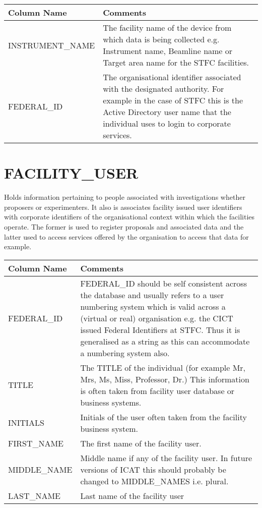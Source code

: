 \documentclass{report}
\begin{document}
\begin{tabular}{|l|l|}
\hline
Column Name & Comments \\ \hline
INSTRUMENT\_NAME & \multicolumn{1}{p{100mm}|}{
The facility name of the device from which data is being collected e.g. Instrument name, Beamline name or Target area name for the STFC facilities.} \\ \hline
FEDERAL\_ID & \multicolumn{1}{p{100mm}|}{
The organisational identifier associated with the designated authority. For example in the case of STFC this is the Active Directory user name that the individual uses to login to corporate services.} \\ \hline
\end{tabular}
\section{FACILITY\_USER}

Holds information pertaining to people associated with investigations whether proposers or experimenters. It also is associates facility issued user identifiers with corporate identifiers of the organisational context within which the facilities operate. The former is used to register proposals and associated data and the latter used to access services offered by the organisation to access that data for example.\\

\begin{tabular}{|l|l|}
\hline
Column Name & Comments \\ \hline
FEDERAL\_ID & \multicolumn{1}{p{100mm}|}{
FEDERAL\_ID should be self consistent across the database and usually refers to a user numbering system which is valid across a (virtual or real) organisation e.g. the CICT issued Federal Identifiers at STFC. Thus it is generalised as a string as this can accommodate a numbering system also.} \\ \hline
TITLE & \multicolumn{1}{p{100mm}|}{
The TITLE of the individual (for example Mr, Mrs, Ms, Miss, Professor, Dr.) This information is often taken from facility user database or business systems.} \\ \hline
INITIALS & \multicolumn{1}{p{100mm}|}{
Initials of the user often taken from the facility business system.} \\ \hline
FIRST\_NAME & \multicolumn{1}{p{100mm}|}{
The first name of the facility user.} \\ \hline
MIDDLE\_NAME & \multicolumn{1}{p{100mm}|}{
Middle name if any of the facility user. In future versions of ICAT this should probably be changed to MIDDLE\_NAMES i.e. plural.} \\ \hline
LAST\_NAME & \multicolumn{1}{p{100mm}|}{
Last name of the facility user} \\ \hline
\end{tabular}
\end{document}
